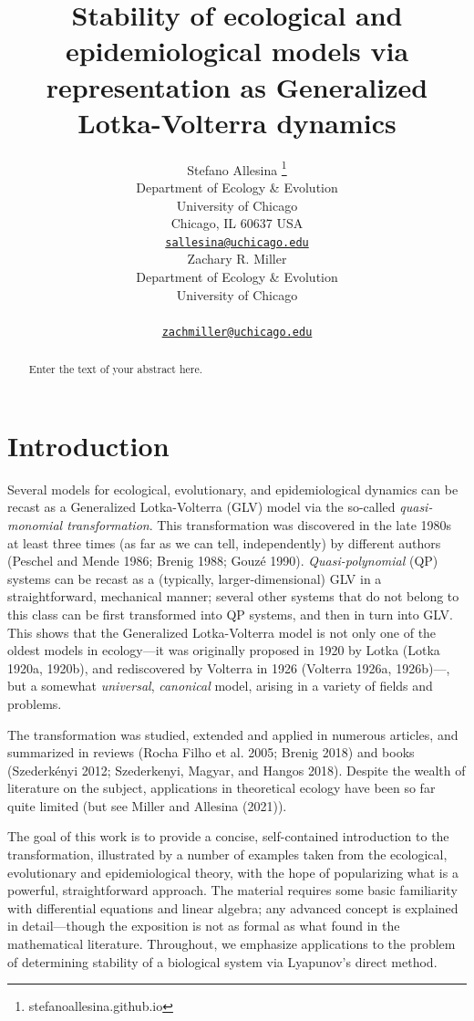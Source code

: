 \documentclass{article}
\title{Stability of ecological and epidemiological models via
representation as Generalized Lotka-Volterra dynamics}
\author{
    Stefano Allesina
    \thanks{stefanoallesina.github.io}
   \\
    Department of Ecology \& Evolution \\
    University of Chicago \\
  Chicago, IL 60637 USA \\
  \texttt{\href{mailto:sallesina@uchicago.edu}{\nolinkurl{sallesina@uchicago.edu}}} \\
   \And
    Zachary R. Miller
   \\
    Department of Ecology \& Evolution \\
    University of Chicago \\
   \\
  \texttt{\href{mailto:zachmiller@uchicago.edu}{\nolinkurl{zachmiller@uchicago.edu}}} \\
  }
\begin{document}
\maketitle

\def\tightlist{}


\begin{abstract}
Enter the text of your abstract here.
\end{abstract}


\hypertarget{introduction}{%
\section{Introduction}\label{introduction}}

Several models for ecological, evolutionary, and epidemiological
dynamics can be recast as a Generalized Lotka-Volterra (GLV) model via
the so-called \emph{quasi-monomial transformation}. This transformation
was discovered in the late 1980s at least three times (as far as we can
tell, independently) by different authors (Peschel and Mende 1986;
Brenig 1988; Gouzé 1990). \emph{Quasi-polynomial} (QP) systems can be
recast as a (typically, larger-dimensional) GLV in a straightforward,
mechanical manner; several other systems that do not belong to this
class can be first transformed into QP systems, and then in turn into
GLV. This shows that the Generalized Lotka-Volterra model is not only
one of the oldest models in ecology---it was originally proposed in 1920
by Lotka (Lotka 1920a, 1920b), and rediscovered by Volterra in 1926
(Volterra 1926a, 1926b)---, but a somewhat \emph{universal},
\emph{canonical} model, arising in a variety of fields and problems.

The transformation was studied, extended and applied in numerous
articles, and summarized in reviews (Rocha Filho et al. 2005; Brenig
2018) and books (Szederkényi 2012; Szederkenyi, Magyar, and Hangos
2018). Despite the wealth of literature on the subject, applications in
theoretical ecology have been so far quite limited (but see Miller and
Allesina (2021)).

The goal of this work is to provide a concise, self-contained
introduction to the transformation, illustrated by a number of examples
taken from the ecological, evolutionary and epidemiological theory, with
the hope of popularizing what is a powerful, straightforward approach.
The material requires some basic familiarity with differential equations
and linear algebra; any advanced concept is explained in detail---though
the exposition is not as formal as what found in the mathematical
literature. Throughout, we emphasize applications to the problem of
determining stability of a biological system via Lyapunov's direct
method.
\end{document}
